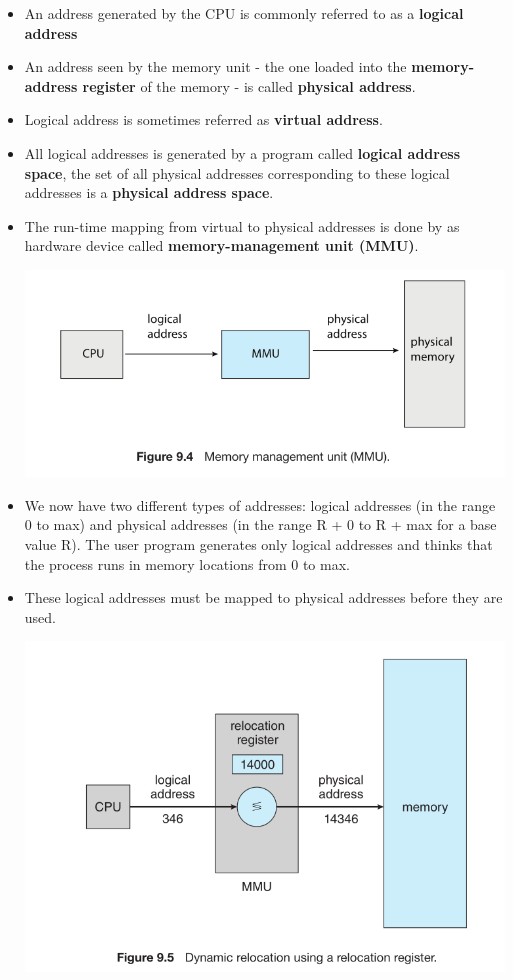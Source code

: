 \documentclass[10pt]{article}
\newcommand{\tf}{\textbf}
\begin{document}
\begin{itemize}
	\item An address generated by the CPU is commonly referred to as a \tf{logical address}
	\item An address seen by the memory unit - the one loaded into the \tf{memory-address register} of the memory - is called \tf{physical address}.
	\item Logical address is sometimes referred as \tf{virtual address}.
	\item All logical addresses is generated by a program called \tf{logical address space}, the set of all physical addresses corresponding to these logical addresses is a \tf{physical address space}.
	\item The run-time mapping from virtual to physical addresses is done by as hardware device called \tf{memory-management unit (MMU)}.
	
	\bigbreak
	\includegraphics[scale = 0.7]{MMU.png}
	\bigbreak

	\item We now have two different types of addresses: logical addresses (in the range 0 to max) and physical addresses (in the range R + 0 to R + max for a base value R). The user program generates only logical addresses and thinks that the process runs in memory locations from 0 to max.
	\item  These logical addresses must be mapped to physical addresses before they are used.
	
	\bigbreak
	\includegraphics[scale = 0.7]{Dynamic-realocation.png}
	\bigbreak
\end{itemize}
\end{document}
